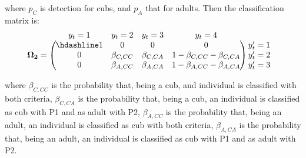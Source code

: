 \documentclass[
  12pt,
]{krantz}
\begin{document}
where \(p_C\) is detection for cubs, and \(p_A\) that for adults. Then the classification matrix is:
\[\begin{matrix}
& \\
\mathbf{\Omega_2} =
    \left ( \vphantom{ \begin{matrix} 12 \\ 12 \\ 12\end{matrix} } \right .
\end{matrix}
\hspace{-1.2em}
\begin{matrix}
    y_t=1 & y_t=2 & y_t=3 & y_t=4\\ \hdashline
1 & 0 & 0 & 0\\
0 & \beta_{C,CC} & \beta_{C,CA} & 1 - \beta_{C,CC} - \beta_{C,CA}\\
0 & \beta_{A,CC} & \beta_{A,CA} & 1 - \beta_{A,CC} - \beta_{A,CA}\\
\end{matrix}
\hspace{-0.2em}
\begin{matrix}
& \\
\left . \vphantom{ \begin{matrix} 12 \\ 12 \\ 12\end{matrix} } \right )
    \begin{matrix}
    y'_{t}=1 \\ y'_{t}=2 \\ y'_{t}=3
    \end{matrix}
\end{matrix}\]

where \(\beta_{C,CC}\) is the probability that, being a cub, and individual is classified with both criteria, \(\beta_{C,CA}\) is the probability that, being a cub, an individual is classified as cub with P1 and as adult with P2, \(\beta_{A,CC}\) is the probability that, being an adult, an individual is classified as cub with both criteria, \(\beta_{A,CA}\) is the probability that, being an adult, an individual is classified as cub with P1 and as adult with P2.
\end{document}
